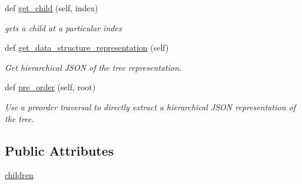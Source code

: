 \begin{DoxyCompactItemize}
def \mbox{\hyperlink{class_bridges_1_1_tree_element_1_1_tree_element_a79ac9326c525aaa5c5ed6a4aebdd1e19}{get\+\_\+child}} (self, index)
\begin{DoxyCompactList}\small\item\em gets a child at a particular index \end{DoxyCompactList}\item 
def \mbox{\hyperlink{class_bridges_1_1_tree_element_1_1_tree_element_a4b8540d7de36235d84a9cbc28b5e3922}{get\+\_\+data\+\_\+structure\+\_\+representation}} (self)
\begin{DoxyCompactList}\small\item\em Get hierarchical J\+S\+ON of the tree representation. \end{DoxyCompactList}\item 
def \mbox{\hyperlink{class_bridges_1_1_tree_element_1_1_tree_element_abb9ef45b12c6a40bfb64aed128f51762}{pre\+\_\+order}} (self, root)
\begin{DoxyCompactList}\small\item\em Use a preorder traversal to directly extract a hierarchical J\+S\+ON representation of the tree. \end{DoxyCompactList}\end{DoxyCompactItemize}
\subsection*{Public Attributes}
\begin{DoxyCompactItemize}
\item 
\mbox{\hyperlink{class_bridges_1_1_tree_element_1_1_tree_element_a95600d695750a3f1f9f6af982282d62a}{children}}
\end{DoxyCompactItemize}
